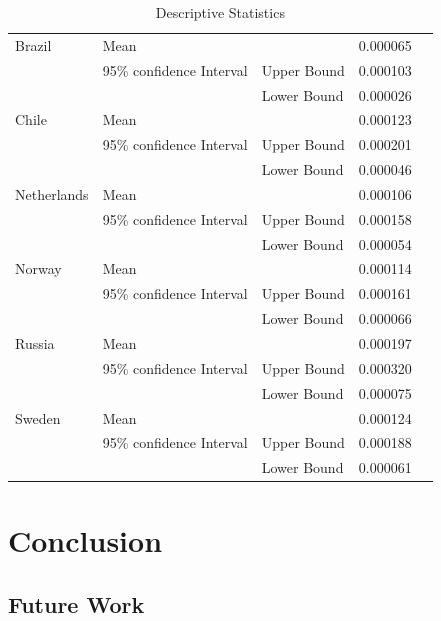 \documentclass[conference]{IEEEtran}
\begin{document}
\begin{table}[ht]
    \centering
    \caption{Descriptive Statistics}
    \begin{tabular}{| l | l | lll |}
    \hline
     Brazil&  Mean&  &  0.000065&   \\
     &  95\% confidence Interval&  Upper Bound&  0.000103&   \\
     &  &  Lower Bound&  0.000026&   \\
     Chile&  Mean&  &  0.000123&   \\
     &  95\% confidence Interval&  Upper Bound&  0.000201&   \\
     &  &  Lower Bound&  0.000046&   \\
     Netherlands&  Mean&  &  0.000106&   \\
     &  95\% confidence Interval&  Upper Bound& 0.000158&   \\
     &  &  Lower Bound&  0.000054&   \\
     Norway&  Mean&  &  0.000114&   \\
     &  95\% confidence Interval&  Upper Bound&  0.000161&   \\
     &  &  Lower Bound&  0.000066&   \\
     Russia&  Mean&  &  0.000197&   \\
     &  95\% confidence Interval&  Upper Bound&  0.000320&   \\
     &  &  Lower Bound&  0.000075&   \\
     Sweden&  Mean&  &  0.000124&   \\
     &  95\% confidence Interval&  Upper Bound&  0.000188&   \\
     &  &  Lower Bound&  0.000061& \\\hline
    \end{tabular}
    \end{table}

\section{Conclusion}

\subsection{Future Work}
\end{document}

